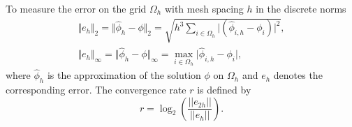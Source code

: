 To measure the error on the grid $\Omega_h$ with mesh spacing $h$ in the
discrete norms
%
\begin{gather*}
  \Vert e_h \Vert_2 = \Vert \hat{\phi}_h - \phi
  \Vert_2 =  \sqrt{h^3 \sum_{i \in 
      \Omega_h} \vert (\hat{\phi}_{i,h}-\phi_i)\vert^2}, \\
  \Vert e_h \Vert_\infty = \Vert \hat{\phi}_h - \phi
  \Vert_\infty =  \max_{i \in \Omega_h} 
  \vert \hat{\phi}_{i,h} - \phi_i \vert,
\end{gather*}
where $\hat{\phi}_h$ is the approximation of the solution $\phi$ on
$\Omega_h$ and $e_h$ denotes the corresponding error.
%
The convergence rate $r$ is defined by
%
\begin{equation*}
  r = \log_2 \left( \frac{\vert\vert e_{2h} \vert\vert}{\vert\vert e_h
      \vert\vert} \right).
\end{equation*}
%
